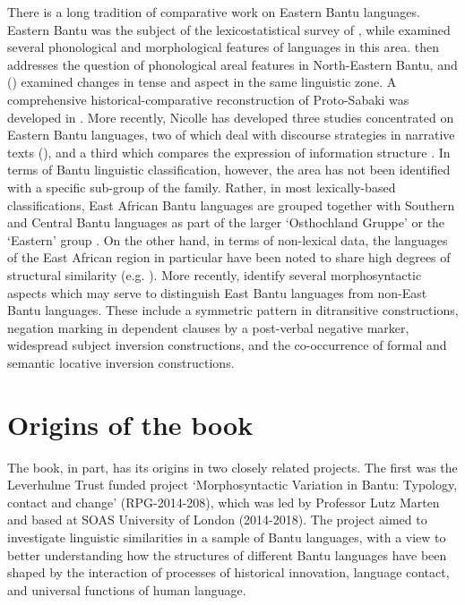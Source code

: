 \documentclass[output=paper]{langscibook}
\begin{document}
There is a long tradition of comparative work on Eastern Bantu languages. Eastern Bantu was the subject of the lexicostatistical survey of \citet{NursePhilippson1980}, while \citet{HinnebuschEtAl1981} examined several phonological and morphological features of languages in this area. \citet{Nurse1985} then addresses the question of phonological areal features in North-Eastern Bantu, and (\citealt{NurseMuzale1999}) examined changes in tense and aspect in the same linguistic zone. A comprehensive historical-comparative reconstruction of Proto-Sabaki was developed in \citet{NurseHinnebusch1993}. More recently, Nicolle has developed three studies concentrated on Eastern Bantu languages, two of which deal with discourse strategies in narrative texts (\citealt{Nicolle2014,Nicolle2015}), and a third which compares the expression of information structure \citep{Nicolle2016}. In terms of Bantu linguistic classification, however, the area has not been identified with a specific sub-group of the family. Rather, in most lexically-based classifications, East African Bantu languages are grouped together with Southern and Central Bantu languages as part of the larger ‘Osthochland Gruppe’ \citep{HeineEtAl1977} or the ‘Eastern’ group \citep{GrollemundEtAl2015}. On the other hand, in terms of non-lexical data, the languages of the East African region in particular have been noted to share high degrees of structural similarity (e.g. \citealt{HinnebuschEtAl1981}). More recently, \citet{EdelstenEtAl2022} identify several morphosyntactic aspects which may serve to distinguish East Bantu languages from non-East Bantu languages. These include a symmetric pattern in ditransitive constructions, negation marking in dependent clauses by a post-verbal negative marker, widespread subject inversion constructions, and the co-occurrence of formal and semantic locative inversion constructions.

\section{Origins of the book}

The book, in part, has its origins in two closely related projects. The first was the Leverhulme Trust funded project ‘Morphosyntactic Variation in Bantu: Typology, contact and change’ (RPG-2014-208), which was led by Professor Lutz Marten and based at SOAS University of London (2014-2018). The project aimed to investigate linguistic similarities in a sample of Bantu languages, with a view to better understanding how the structures of different Bantu languages have been shaped by the interaction of processes of historical innovation, language contact, and universal functions of human language. 
\end{document}
